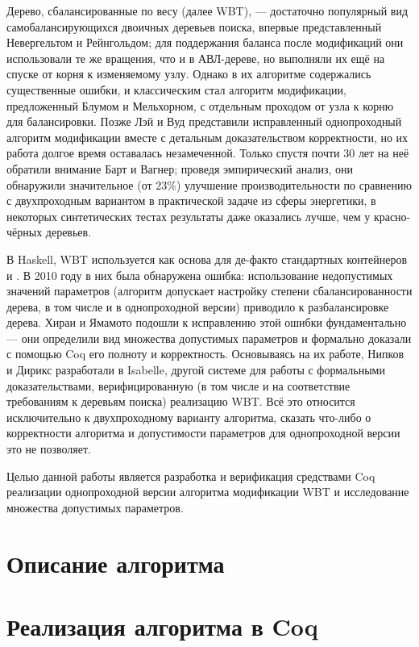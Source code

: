 \documentclass[a4paper,14pt]{extarticle}
\begin{document}
Дерево, сбалансированные по весу (далее WBT), --- достаточно популярный вид
самобалансирующихся двоичных деревьев поиска,
впервые представленный Невергельтом и Рейнгольдом\cite{nievergelt};
для поддержания баланса после модификаций они использовали
те же вращения, что и в АВЛ-дереве\cite{avl},
но выполняли их ещё на спуске от корня к изменяемому узлу.
Однако в их алгоритме содержались существенные ошибки,
и классическим стал алгоритм модификации,
предложенный Блумом и Мельхорном\cite{blum},
с отдельным проходом от узла к корню для балансировки.
Позже Лэй и Вуд представили исправленный
однопроходный алгоритм модификации
вместе с детальным доказательством корректности\cite{lai},
но их работа долгое время оставалась незамеченной.
Только спустя почти 30 лет на неё обратили внимание
Барт и Вагнер;
проведя эмпирический анализ, они обнаружили
значительное (от 23\%) улучшение производительности
по сравнению с двухпроходным вариантом в практической задаче из сферы энергетики,
в некоторых синтетических тестах
результаты даже оказались лучше, чем у красно-чёрных деревьев\cite{barth}.

В Haskell, WBT используется как основа для
де-факто стандартных контейнеров  и .
В 2010 году в них была обнаружена ошибка:
использование недопустимых значений параметров
(алгоритм допускает настройку степени сбалансированности дерева,
в том числе и в однопроходной версии)
приводило к разбалансировке дерева.
Хираи и Ямамото подошли к исправлению этой ошибки фундаментально ---
они определили вид множества допустимых параметров
и формально доказали с помощью Coq его полноту и корректность\cite{hirai}.
Основываясь на их работе,
Нипков и Дирикс разработали в Isabelle,
другой системе для работы с формальными доказательствами,
верифицированную (в том числе и на соответствие требованиям к деревьям поиска)
реализацию WBT\cite{nipkow}.
Всё это относится исключительно
к двухпроходному варианту алгоритма,
сказать что-либо о корректности алгоритма и допустимости параметров
для однопроходной версии это не позволяет.

Целью данной работы является
разработка и верификация средствами Coq
реализации однопроходной версии алгоритма модификации WBT
и исследование множества допустимых параметров.

\clearpage
\section{Описание алгоритма}

\clearpage
\section{Реализация алгоритма в Coq}
\end{document}
